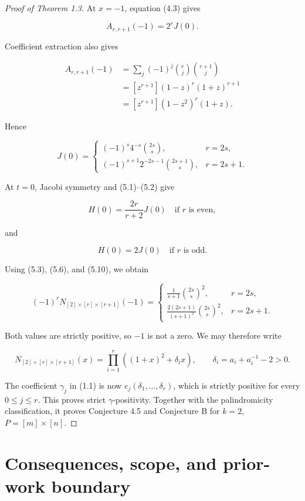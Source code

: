 \documentclass[11pt]{article}
\numberwithin{equation}{section}
\begin{document}
\begin{proof}[Proof of Theorem 1.3]
At $x=-1$, equation (4.3) gives

\nopagebreak[4]
\[
A_{r,r+1}(-1)=2^rJ(0).
\]

Coefficient extraction also gives

\nopagebreak[4]
\[
\begin{aligned}
A_{r,r+1}(-1)
&=\sum_j(-1)^j\binom rj\binom{r+1}j\\
&=[z^{r+1}](1-z)^r(1+z)^{r+1}\\
&=[z^{r+1}](1-z^2)^r(1+z).
\end{aligned}
\tag{5.9}
\]

Hence

\nopagebreak[4]
\[
J(0)=
\begin{cases}
(-1)^s4^{-s}\binom{2s}{s},&r=2s,\\[4pt]
(-1)^{s+1}2^{-2s-1}\binom{2s+1}{s},&r=2s+1.
\end{cases}
\tag{5.10}
\]

At $t=0$, Jacobi symmetry and (5.1)--(5.2) give

\nopagebreak[4]
\[
H(0)=\frac{2r}{r+2}J(0)\quad\text{if }r\text{ is even},
\]

and

\nopagebreak[4]
\[
H(0)=2J(0)\quad\text{if }r\text{ is odd}.
\]

Using (5.3), (5.6), and (5.10), we obtain

\nopagebreak[4]
\[
(-1)^rN_{[2]\times[r]\times[r+1]}(-1)
=
\begin{cases}
\displaystyle\frac{1}{s+1}\binom{2s}{s}^{\!2},
&r=2s,\\[8pt]
\displaystyle\frac{2(2s+1)}{(s+1)^2}\binom{2s}{s}^{\!2},
&r=2s+1.
\end{cases}
\tag{5.11}
\]

Both values are strictly positive, so $-1$ is not a zero. We may therefore
write

\nopagebreak[4]
\[
N_{[2]\times[r]\times[r+1]}(x)
=\prod_{i=1}^r\left((1+x)^2+\delta_i x\right),
\qquad
\delta_i=a_i+a_i^{-1}-2>0.
\tag{5.12}
\]

The coefficient $\gamma_j$ in (1.1) is now
$e_j(\delta_1,\ldots,\delta_r)$, which is strictly positive for every
$0\leq j\leq r$. This proves strict $\gamma$-positivity. Together with the
palindromicity classification, it proves Conjecture 4.5 and Conjecture B for
$k=2$, $P=[m]\times[n]$.
\end{proof}


\section{Consequences, scope, and prior-work boundary}
\end{document}
